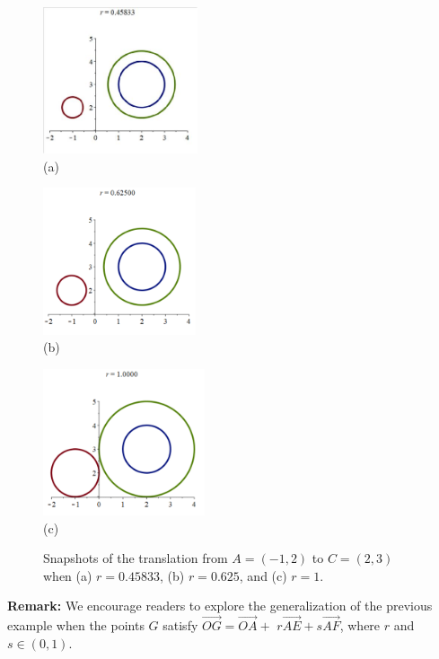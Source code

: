 \documentclass[12pt,a4paper]{article}%
\begin{document}
\begin{figure}[htpb]
\begin{center}
\parbox[b]{1.9in}{\begin{center}
\includegraphics[height=1.7in,trim=0mm 0mm 0mm 12mm,clip,keepaspectratio]{PJH75H19-crop.pdf}
 \\ (a)
\end{center}}
\qquad
\parbox[b]{1.9in}{\begin{center}
\includegraphics[height=1.7in,trim=0mm 0mm 0mm 10mm,clip,keepaspectratio]{PJH75H1A.pdf}
 \\ (b)
\end{center}}
\qquad
\parbox[b]{1.9in}{\begin{center}
\includegraphics[height=1.7in,trim=0mm 0mm 0mm 10mm,clip,keepaspectratio]{PJH75H1B.pdf}
 \\ (c)
\end{center}}
\end{center}
\caption{Snapshots of the translation from $A=(-1,2)$ to $C=(2,3)$ when (a) $r=0.45833$, (b) $r=0.625$, and (c) $r=1$.}
\label{fig6}
\end{figure}

\textbf{Remark:}
We encourage readers to explore the generalization of the previous
example when the points $G$ satisfy
$\overrightarrow{OG}=\overrightarrow{OA}+$ $r\overrightarrow{AE}+s\overrightarrow{AF}$,
where $r$ and $s\in(0,1)$.
\end{document}
